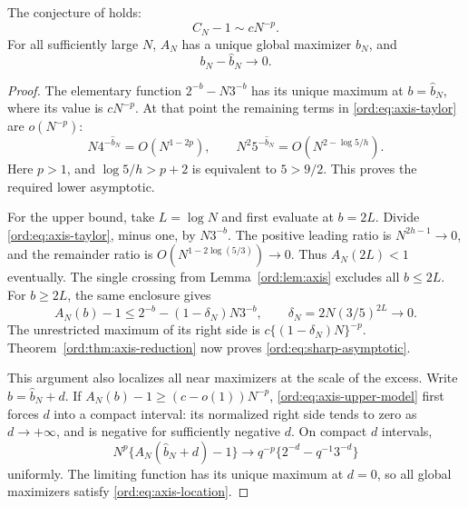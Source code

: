 \begin{theorem}
\label{ord:thm:leading}
The conjecture of \cite[Section 9]{IncomingBounds} holds:
\begin{equation}\label{ord:eq:sharp-asymptotic}
 C_N-1\sim cN^{-p}.
\end{equation}
For all sufficiently large $N$, $A_N$ has a unique global maximizer
$b_N$, and
\begin{equation}\label{ord:eq:axis-location}
 b_N-\widehat b_N\longrightarrow0.
\end{equation}
\end{theorem}
\begin{proof}
The elementary function $2^{-b}-N3^{-b}$ has its unique maximum at
$b=\widehat b_N$, where its value is $cN^{-p}$. At that point the
remaining terms in \eqref{ord:eq:axis-taylor} are $o(N^{-p})$:
\[
 N4^{-\widehat b_N}=O(N^{1-2p}),\qquad
 N^2 5^{-\widehat b_N}=O(N^{2-\log5/h}).
\]
Here $p>1$, and $\log5/h>p+2$ is equivalent to $5>9/2$. This proves
the required lower asymptotic.

For the upper bound, take $L=\log N$ and first evaluate at $b=2L$.
Divide \eqref{ord:eq:axis-taylor}, minus one, by $N3^{-b}$. The positive
leading ratio is $N^{2h-1}\to0$, and the remainder ratio is
$O(N^{1-2\log(5/3)})\to0$. Thus $A_N(2L)<1$ eventually. The single
crossing from Lemma~\ref{ord:lem:axis} excludes all $b\le2L$.
For $b\ge2L$, the same enclosure gives
\begin{equation}\label{ord:eq:axis-upper-model}
 A_N(b)-1\le2^{-b}-(1-\delta_N)N3^{-b},\qquad
 \delta_N=2N(3/5)^{2L}\longrightarrow0.
\end{equation}
The unrestricted maximum of its right side is
$c\{(1-\delta_N)N\}^{-p}$. Theorem~\ref{ord:thm:axis-reduction} now
proves \eqref{ord:eq:sharp-asymptotic}.

This argument also localizes all near maximizers at the scale of the
excess. Write $b=\widehat b_N+d$. If
$A_N(b)-1\ge(c-o(1))N^{-p}$, \eqref{ord:eq:axis-upper-model} first forces
$d$ into a compact interval: its normalized right side tends to zero
as $d\to+\infty$, and is negative for sufficiently negative $d$.
On compact $d$ intervals,
\begin{equation}\label{ord:eq:profile}
 N^p\{A_N(\widehat b_N+d)-1\}
 \longrightarrow q^{-p}\{2^{-d}-q^{-1}3^{-d}\}
\end{equation}
uniformly. The limiting function has its unique maximum at $d=0$,
so all global maximizers satisfy \eqref{ord:eq:axis-location}.


\end{proof}
